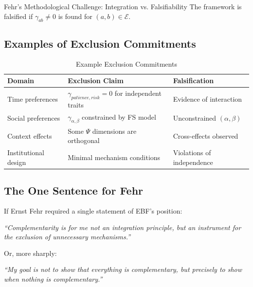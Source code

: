 \begin{chapter}{Fehr's Methodological Challenge: Integration vs. Falsifiability}
The framework is falsified if $\gamma_{ab} \neq 0$ is found for $(a,b) \in \mathcal{E}$.

\subsection{Examples of Exclusion Commitments}

\begin{table}[h]
\centering
\caption{Example Exclusion Commitments}
\label{tab:exclusion-examples}
\renewcommand{\arraystretch}{1.3}
\begin{tabular}{@{}p{4cm}p{4cm}p{4cm}@{}}
\toprule
\textbf{Domain} & \textbf{Exclusion Claim} & \textbf{Falsification} \\
\midrule
Time preferences & $\gamma_{patience, risk} = 0$ for independent traits & Evidence of interaction \\
Social preferences & $\gamma_{\alpha, \beta}$ constrained by FS model & Unconstrained $(\alpha, \beta)$ \\
Context effects & Some $\Psi$ dimensions are orthogonal & Cross-effects observed \\
Institutional design & Minimal mechanism conditions & Violations of independence \\
\bottomrule
\end{tabular}
\end{table}

\subsection{The One Sentence for Fehr}

If Ernst Fehr required a single statement of EBF's position:

\begin{tcolorbox}[colback=blue!10!white,colframe=blue!75!black]
\begin{center}
\large
\textit{``Complementarity is for me not an integration principle, but an instrument for the exclusion of unnecessary mechanisms.''}
\end{center}
\end{tcolorbox}

Or, more sharply:

\begin{tcolorbox}[colback=blue!10!white,colframe=blue!75!black]
\begin{center}
\large
\textit{``My goal is not to show that everything is complementary, but precisely to show when nothing is complementary.''}
\end{center}
\end{tcolorbox}


\end{chapter}

